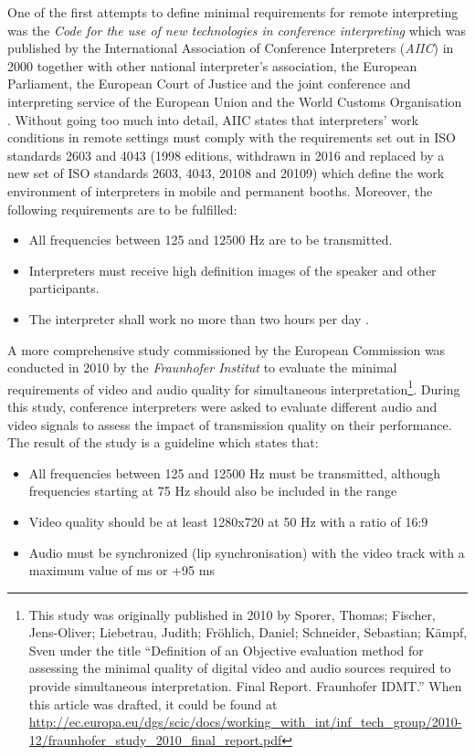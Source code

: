 \documentclass[output=paper]{langsci/langscibook}
\begin{document}
One of the first attempts to define minimal requirements for remote interpreting was the \textit{Code for the use of new technologies in conference interpreting} which was published by the International Association of Conference Interpreters (\textit{AIIC}) in 2000 together with other national interpreter’s association, the European Parliament, the European Court of Justice and the joint conference and interpreting service of the European Union and the World Customs Organisation \citep[31]{Korak2010}. Without going too much into detail, AIIC states that interpreters’ work conditions in remote settings must comply with the requirements set out in \textsc{ISO} standards 2603 and 4043 (1998 editions, withdrawn in 2016 and replaced by a new set of \textsc{ISO} standards 2603, 4043, 20108 and 20109) which define the work environment of interpreters in mobile and permanent booths. Moreover, the following requirements are to be fulfilled:

\begin{itemize}
\item All frequencies between 125 and 12500 Hz are to be transmitted.
\item Interpreters must receive high definition images of the speaker and other participants. 
\item The interpreter shall work no more than two hours per day \citep[2]{AIIC2000}.
\end{itemize}

A more comprehensive study commissioned by the European Commission was conducted in 2010 by the \textit{Fraunhofer Institut} to evaluate the minimal requirements of video and audio quality for simultaneous interpretation\footnote{This study was originally published in 2010 by Sporer, Thomas; Fischer, Jens-Oliver; Liebetrau, Judith; Fröhlich, Daniel; Schneider, Sebastian; Kämpf, Sven under the title “Definition of an Objective evaluation method for assessing the minimal quality of digital video and audio sources required to provide simultaneous interpretation. Final Report. Fraunhofer IDMT.” When this article was drafted, it could be found at \url{http://ec.europa.eu/dgs/scic/docs/working_with_int/inf_tech_group/2010-12/fraunhofer_study_2010_final_report.pdf}}. During this study, conference interpreters were asked to evaluate different audio and video signals to assess the impact of transmission quality on their performance. The result of the study is a guideline which states that:

\begin{itemize}
\item All frequencies between 125 and 12500 Hz must be transmitted, although frequencies starting at 75 Hz should also be included in the range
\item Video quality should be at least 1280x720 at 50 Hz with a ratio of 16:9
\item Audio must be synchronized (lip synchronisation) with the video track with a maximum value of  ms or +95 ms
\end{itemize}
\end{document}
